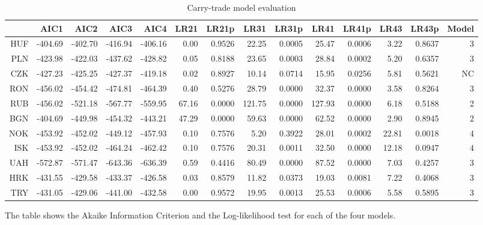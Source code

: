 \documentclass[preprint,12pt,authoryear]{elsarticle}
\begin{document}
\begin{landscape}
\begin{table}[ht]
\begin{threeparttable}
\centering
\begin{tabular}{rrrrrrrrrrrrrr}
  \hline
 & AIC1 & AIC2 & AIC3 & AIC4 & LR21 & LR21p & LR31 & LR31p & LR41 & LR41p & LR43 & LR43p& Model \\ 
  \hline
HUF & -404.69 & -402.70 & -416.94 & -406.16 & 0.00 & 0.9526 & 22.25 & 0.0005 & 25.47 & 0.0006 & 3.22 & 0.8637 & 3\\ 
  PLN & -423.98 & -422.03 & -437.62 & -428.82 & 0.05 & 0.8188 & 23.65 & 0.0003 & 28.84 & 0.0002 & 5.20 & 0.6357 &3\\ 
  CZK & -427.23 & -425.25 & -427.37 & -419.18 & 0.02 & 0.8927 & 10.14 & 0.0714 & 15.95 & 0.0256 & 5.81 & 0.5621 &NC \\ 
  RON & -456.02 & -454.42 & -474.81 & -464.39 & 0.40 & 0.5276 & 28.79 & 0.0000 & 32.37 & 0.0000 & 3.58 & 0.8264 & 3\\ 
  RUB & -456.02 & -521.18 & -567.77 & -559.95 & 67.16 & 0.0000 & 121.75 & 0.0000 & 127.93 & 0.0000 & 6.18 & 0.5188 & 2\\ 
  BGN & -404.69 & -449.98 & -454.32 & -443.21 & 47.29 & 0.0000 & 59.63 & 0.0000 & 62.52 & 0.0000 & 2.90 & 0.8945 & 2\\ 
  NOK & -453.92 & -452.02 & -449.12 & -457.93 & 0.10 & 0.7576 & 5.20 & 0.3922 & 28.01 & 0.0002 & 22.81 & 0.0018 &4 \\ 
  ISK & -453.92 & -452.02 & -464.24 & -462.42 & 0.10 & 0.7576 & 20.31 & 0.0011 & 32.50 & 0.0000 & 12.18 & 0.0947 &  4\\ 
  UAH & -572.87 & -571.47 & -643.36 & -636.39 & 0.59 & 0.4416 & 80.49 & 0.0000 & 87.52 & 0.0000 & 7.03 & 0.4257 &3\\ 
  HRK & -431.55 & -429.58 & -433.37 & -426.58 & 0.03 & 0.8579 & 11.82 & 0.0373 & 19.03 & 0.0081 & 7.22 & 0.4068 &3\\ 
  TRY & -431.05 & -429.06 & -441.00 & -432.58 & 0.00 & 0.9572 & 19.95 & 0.0013 & 25.53 & 0.0006 & 5.58 & 0.5895 &3\\ 
   \hline
\end{tabular}
\begin{tablenotes}
\small
\item The table shows the Akaike Information Criterion and the Log-likelihood test for each of the four models.  
\end{tablenotes}
\end{threeparttable}
\caption{Carry-trade model evaluation} 
\label{tabref:ctme}
\end{table}
\end{landscape}
\end{document}
